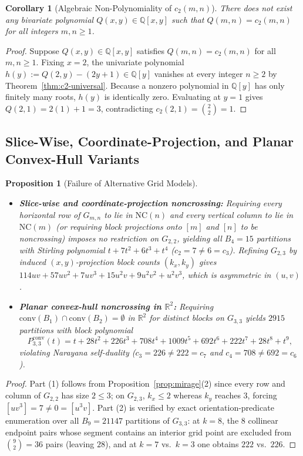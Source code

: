 \documentclass[11pt]{article}
\theoremstyle{plain}
\newtheorem{proposition}[theorem]{Proposition}
\newtheorem{corollary}[theorem]{Corollary}
\theoremstyle{definition}
\newcommand{\NC}{\mathrm{NC}}
\newcommand{\Q}{\mathbb{Q}}
\newcommand{\R}{\mathbb{R}}
\newcommand{\conv}{\mathrm{conv}}
\begin{document}
\begin{corollary}[Algebraic Non-Polynomiality of $c_2(m, n)$]\label{cor:non-poly}
There does not exist any bivariate polynomial $Q(x, y) \in \Q[x, y]$ such that $Q(m, n) = c_2(m, n)$ for all integers $m, n \ge 1$.
\end{corollary}
\begin{proof}
Suppose $Q(x, y) \in \Q[x, y]$ satisfies $Q(m, n) = c_2(m, n)$ for all $m, n \ge 1$. Fixing $x = 2$, the univariate polynomial $h(y) := Q(2, y) - (2y + 1) \in \Q[y]$ vanishes at every integer $n \ge 2$ by Theorem~\ref{thm:c2-universal}. Because a nonzero polynomial in $\Q[y]$ has only finitely many roots, $h(y)$ is identically zero. Evaluating at $y = 1$ gives $Q(2, 1) = 2(1) + 1 = 3$, contradicting $c_2(2, 1) = \binom{2}{2} = 1$.
\end{proof}

\subsection{Slice-Wise, Coordinate-Projection, and Planar Convex-Hull Variants}

\begin{proposition}[Failure of Alternative Grid Models]\label{prop:grid-variants}
\leavevmode
\begin{itemize}\setlength{\itemsep}{2pt}
  \item[(1)] \textbf{Slice-wise and coordinate-projection noncrossing:} Requiring every horizontal row of $G_{m,n}$ to lie in $\NC(n)$ and every vertical column to lie in $\NC(m)$ (or requiring block projections onto $[m]$ and $[n]$ to be noncrossing) imposes no restriction on $G_{2,2}$, yielding all $B_4 = 15$ partitions with Stirling polynomial $t + 7t^2 + 6t^3 + t^4$ ($c_2 = 7 \ne 6 = c_3$). Refining $G_{2,3}$ by induced $(x, y)$-projection block counts $(k_x, k_y)$ gives $114uv + 57uv^2 + 7uv^3 + 15u^2v + 9u^2v^2 + u^2v^3$, which is asymmetric in $(u, v)$.
  \item[(2)] \textbf{Planar convex-hull noncrossing in $\R^2$:} Requiring $\conv(B_1) \cap \conv(B_2) = \emptyset$ in $\R^2$ for distinct blocks on $G_{3,3}$ yields $2915$ partitions with block polynomial
  \[
    P_{3,3}^{\conv}(t) = t + 28t^2 + 226t^3 + 708t^4 + 1009t^5 + 692t^6 + 222t^7 + 28t^8 + t^9,
  \]
  violating Narayana self-duality ($c_3 = 226 \ne 222 = c_7$ and $c_4 = 708 \ne 692 = c_6$).
\end{itemize}
\end{proposition}
\begin{proof}
Part (1) follows from Proposition~\ref{prop:mirage}(2) since every row and column of $G_{2,2}$ has size $2 \le 3$; on $G_{2,3}$, $k_x \le 2$ whereas $k_y$ reaches $3$, forcing $[uv^3] = 7 \ne 0 = [u^3v]$. Part (2) is verified by exact orientation-predicate enumeration over all $B_9 = 21147$ partitions of $G_{3,3}$: at $k = 8$, the $8$ collinear endpoint pairs whose segment contains an interior grid point are excluded from $\binom{9}{2} = 36$ pairs (leaving $28$), and at $k = 7$ vs.\ $k = 3$ one obtains $222$ vs.\ $226$.
\end{proof}
\end{document}
